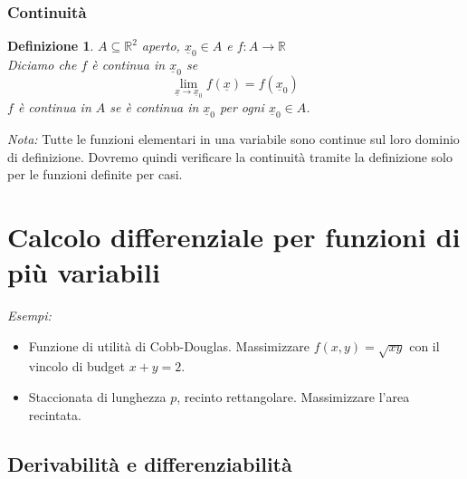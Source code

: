 \documentclass{scrreprt}
\newtheorem{defn}{Definizione}
\newenvironment{definition}{\begin{mdframed}[backgroundcolor=Ivory2]\begin{defn}}{\end{defn}\end{mdframed}}
\begin{document}
\subsection{Continuità}
\begin{definition}
	$A \subseteq \mathbb{R}^2$ aperto, $\underline{x}_0 \in A$ e $f: A \to \mathbb{R}$\\
	Diciamo che $f$ è continua in $\underline{x}_0$ se
	\begin{equation}
		\lim_{\underline{x} \to \underline{x}_0} f(\underline{x}) = f(\underline{x}_0)
	\end{equation}
	$f$ è continua in $A$ se è continua in $\underline{x}_0$ per ogni $\underline{x}_0 \in A$.
\end{definition}

\emph{Nota:} Tutte le funzioni elementari in una variabile sono continue sul loro dominio di definizione.
Dovremo quindi verificare la continuità tramite la definizione solo per le funzioni definite per casi.




\chapter{Calcolo differenziale per funzioni di più variabili}
\emph{Esempi:}
\begin{itemize}
	\item Funzione di utilità di Cobb-Douglas. Massimizzare $f(x,y) = \sqrt{xy}$ con il vincolo di budget $x+y=2$. 
	\item Staccionata di lunghezza $p$, recinto rettangolare. Massimizzare l'area recintata.
\end{itemize}

\section{Derivabilità e differenziabilità}
\end{document}
